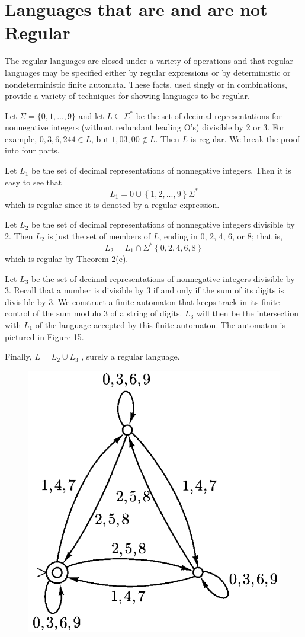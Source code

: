 \section{Languages that are and are not Regular}

The regular languages are closed under a variety of operations and that regular languages may be specified either by regular expressions or by deterministic or nondeterministic finite automata. These facts, used singly or in combinations, provide a variety of techniques for showing languages to be regular.

\begin{example}{}
  Let $\Sigma = \{0, 1, ..., 9\}$ and let $L \subseteq \Sigma^*$ be the set of decimal representations for nonnegative integers (without redundant leading O's) divisible by 2 or 3. For example, $0, 3, 6, 244 \in L$, but $1, 03, 00 \notin L$. Then $L$ is regular. We break the proof into four parts.

  \quad Let $L_1$ be the set of decimal representations of nonnegative integers. Then it is easy to see that
  \begin{equation*}
    L_1 = 0 \cup \left\{ 1, 2, ..., 9 \right\} \Sigma^*
  \end{equation*}
  which is regular since it is denoted by a regular expression.

  \quad Let $L_2$ be the set of decimal representations of nonnegative integers divisible by 2. Then $L_2$ is just the set of members of $L$, ending in 0, 2, 4, 6, or 8; that is,
  \begin{equation*}
    L_2 = L_1 \cap \Sigma^* \left\{ 0, 2, 4, 6, 8 \right\}
  \end{equation*}
  which is regular by Theorem 2(e).

  \quad Let $L_3$ be the set of decimal representations of nonnegative integers divisible by 3. Recall that a number is divisible by 3 if and only if the sum of its digits is divisible by 3. We construct a finite automaton that keeps track in its finite control of the sum modulo 3 of a string of digits. $L_3$ will then be the intersection with $L_1$ of the language accepted by this finite automaton. The automaton is pictured in Figure 15.

  \quad Finally, $L = L_2 \cup L_3$ , surely a regular language.
\end{example}

\begin{figure}[h!]
  \centering
  \includegraphics[width=.3\textwidth]{img/Fig2.18.png}
  \caption{}
\end{figure}


